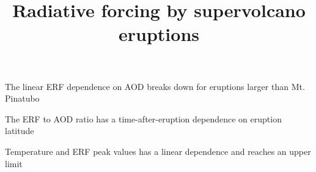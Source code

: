 \documentclass[draft]{agujournal2019}
\begin{document}
   


  \title{Radiative forcing by supervolcano eruptions}





  \begin{keypoints}
    \item
    The linear ERF dependence on AOD breaks down for eruptions larger than Mt. Pinatubo
    \item
    The ERF to AOD ratio has a time-after-eruption dependence on eruption latitude
    \item
    Temperature and ERF peak values has a linear dependence and reaches an upper limit
  \end{keypoints}
\end{document}
